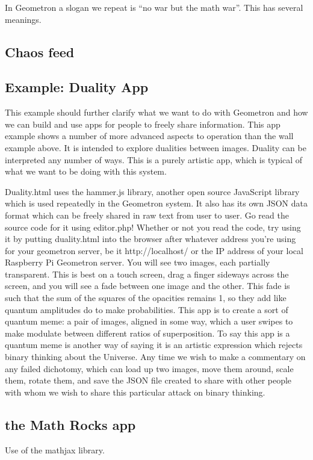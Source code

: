 In Geometron a slogan we repeat is ``no war but the math war''.  This has several meanings.

\subsection{Chaos feed}

\subsection{Example: Duality App}

This example should further clarify what we want to do with Geometron and how we can build and use apps for people to freely share information.  This app example shows a number of more advanced aspects to operation than the wall example above. It is intended to explore dualities between images.  Duality can be interpreted any number of ways.  This is a purely artistic app, which is typical of what we want to be doing with this system.  

Duality.html uses the hammer.js library, another open source JavaScript library which is used repeatedly in the Geometron system.  It also has its own JSON data format which can be freely shared in raw text from user to user.  Go read the source code for it using editor.php!  Whether or not you read the code, try using it by putting duality.html into the browser after whatever address you're using for your geometron server, be it http://localhost/ or the IP address of your local Raspberry Pi Geometron server.  You will see two images, each partially transparent. This is best on a touch screen, drag a finger sideways across the screen, and you will see a fade between one image and the other. This fade is such that the sum of the squares of the opacities remains 1, so they add like quantum amplitudes do to make probabilities.  This app is to create a sort of quantum meme: a pair of images, aligned in some way, which a user swipes to make modulate between different ratios of superposition. To say this app is a quantum meme is another way of saying it is an artistic expression which rejects binary thinking about the Universe.  Any time we wish to make a commentary on any failed dichotomy, which can load up two images, move them around, scale them, rotate them, and save the JSON file created to share with other people with whom we wish to share this particular attack on binary thinking.

\subsection{the Math Rocks app}

Use of the mathjax library.